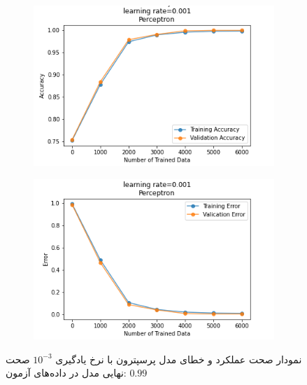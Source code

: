 \documentclass[12pt, a4paper]{article}
\begin{document}
\begin{figure}[h]
    \begin{subfigure}{0.45\linewidth}
        \centering
        \includegraphics[width=\linewidth]{images/3/perceptron/lr/acc_0.001.png}
    \end{subfigure}
    \hfil
    \begin{subfigure}{0.45\linewidth}
        \centering
        \includegraphics[width=\linewidth]{images/3/perceptron/lr/error_0.001.png}
    \end{subfigure}
    \caption{نمودار صحت عملکرد‌ و خطای مدل پرسپترون با نرخ یادگیری $10^{-3}$
    \newline
    صحت نهایی مدل در داده‌های آزمون: $0.99$}
\end{figure}
\end{document}
